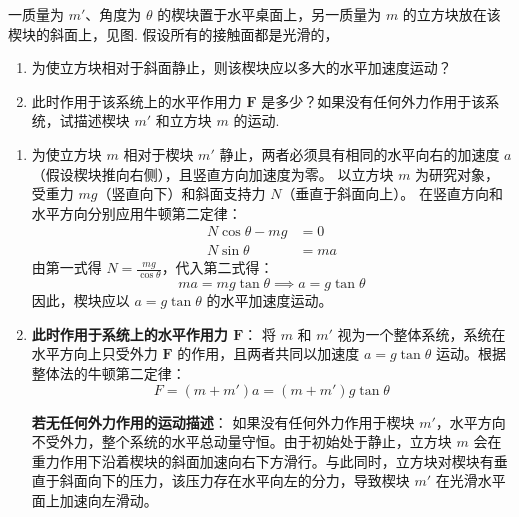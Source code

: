 \begin{exercise}\label{ex:3.2}
一质量为 $m'$、角度为 $\theta$ 的楔块置于水平桌面上，另一质量为 $m$ 的立方块放在该楔块的斜面上，见图. 假设所有的接触面都是光滑的，
\begin{enumerate}
  \item[(a)] 为使立方块相对于斜面静止，则该楔块应以多大的水平加速度运动？
  \item[(b)] 此时作用于该系统上的水平作用力 $\boldsymbol{F}$ 是多少？如果没有任何外力作用于该系统，试描述楔块 $m'$ 和立方块 $m$ 的运动.
\end{enumerate}
\begin{center}
\end{center}
\end{exercise}
\begin{solution}
\begin{enumerate}
    \item[(a)] 为使立方块 $m$ 相对于楔块 $m'$ 静止，两者必须具有相同的水平向右的加速度 $a$（假设楔块推向右侧），且竖直方向加速度为零。
    以立方块 $m$ 为研究对象，受重力 $mg$（竖直向下）和斜面支持力 $N$（垂直于斜面向上）。
    在竖直方向和水平方向分别应用牛顿第二定律：
    \begin{align*}
        N \cos\theta - mg &= 0 \\
        N \sin\theta &= m a
    \end{align*}
    由第一式得 $N = \frac{mg}{\cos\theta}$，代入第二式得：
    $$ m a = mg \tan\theta \implies a = g \tan\theta $$
    因此，楔块应以 $a = g \tan\theta$ 的水平加速度运动。

    \item[(b)] \textbf{此时作用于系统上的水平作用力 $\boldsymbol{F}$}：
    将 $m$ 和 $m'$ 视为一个整体系统，系统在水平方向上只受外力 $\boldsymbol{F}$ 的作用，且两者共同以加速度 $a = g \tan\theta$ 运动。根据整体法的牛顿第二定律：
    $$ F = (m + m') a = (m + m') g \tan\theta $$

    \textbf{若无任何外力作用的运动描述}：
    如果没有任何外力作用于楔块 $m'$，水平方向不受外力，整个系统的水平总动量守恒。由于初始处于静止，立方块 $m$ 会在重力作用下沿着楔块的斜面加速向右下方滑行。与此同时，立方块对楔块有垂直于斜面向下的压力，该压力存在水平向左的分力，导致楔块 $m'$ 在光滑水平面上加速向左滑动。
\end{enumerate}
\end{solution}

